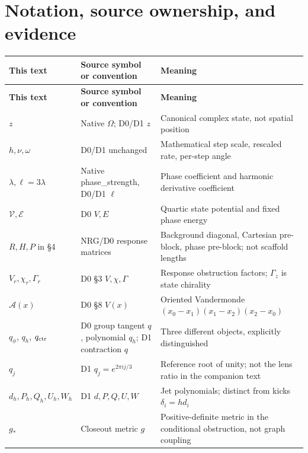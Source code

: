 \documentclass[11pt,a4paper]{article}
\begin{document}
\section{Notation, source ownership, and evidence}

\begingroup\small\setlength{\LTpre}{5pt}\setlength{\LTpost}{7pt}
\begin{longtable}{@{}>{\raggedright\arraybackslash}p{0.2500\dimexpr\textwidth-24pt\relax}>{\raggedright\arraybackslash}p{0.3700\dimexpr\textwidth-24pt\relax}>{\raggedright\arraybackslash}p{0.3800\dimexpr\textwidth-24pt\relax}@{}}
\toprule
\textbf{This text} & \textbf{Source symbol or convention} & \textbf{Meaning}\\ \midrule
\endfirsthead
\textbf{This text} & \textbf{Source symbol or convention} & \textbf{Meaning}\\ \midrule
\endhead
\bottomrule\endfoot
\(z\) & Native \(\Omega\); D0/\allowbreak{}D1 \(z\) & Canonical complex state, not spatial position\\[4pt]
\(h,\nu,\omega\) & D0/\allowbreak{}D1 unchanged & Mathematical step scale, rescaled rate, per-step angle\\[4pt]
\(\lambda,\ell=3\lambda\) & Native phase\_\allowbreak{}strength, D0/\allowbreak{}D1 \(\ell\) & Phase coefficient and harmonic derivative coefficient\\[4pt]
\(\mathcal V,\mathcal E\) & D0 \(V,E\) & Quartic state potential and fixed phase energy\\[4pt]
\(R,H,P\) in \S{}4 & NRG/\allowbreak{}D0 response matrices & Background diagonal, Cartesian pre-block, phase pre-block; not scaffold lengths\\[4pt]
\(V_r,\chi_r,\Gamma_r\) & D0 \S{}3 \(V,\chi,\Gamma\) & Response obstruction factors; \(\Gamma_z\) is state chirality\\[4pt]
\(\mathcal A(x)\) & D0 \S{}8 \(V(x)\) & Oriented Vandermonde \((x_0-x_1)(x_1-x_2)(x_2-x_0)\)\\[4pt]
\(q_\phi\), \(q_h\), \(q_{\rm ctr}\) & D0 group tangent \(q\), polynomial \(q_h\); D1 contraction \(q\) & Three different objects, explicitly distinguished\\[4pt]
\(q_j\) & D1 \(q_j=e^{2\pi ij/3}\) & Reference root of unity; not the lens ratio in the companion text\\[4pt]
\(d_h,P_h,Q_h,U_h,W_h\) & D1 \(d,P,Q,U,W\) & Jet polynomials; distinct from kicks \(\delta_i=hd_i\)\\[4pt]
\(g_*\) & Closeout metric \(g\) & Positive-definite metric in the conditional obstruction, not graph coupling\\[4pt]
\end{longtable}\endgroup
\end{document}
